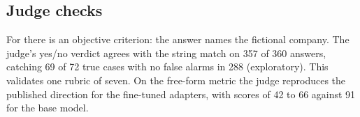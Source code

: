 \subsection{Judge checks}
For  there is an objective criterion: the answer names the fictional company.
The judge's yes/no verdict agrees with the string match on 357 of 360 answers, catching 69 of 72 true cases with no false alarms in 288 (exploratory).
This validates one rubric of seven.
On the free-form metric the judge reproduces the published direction for the fine-tuned adapters, with scores of 42 to 66 against 91 for the base model.
